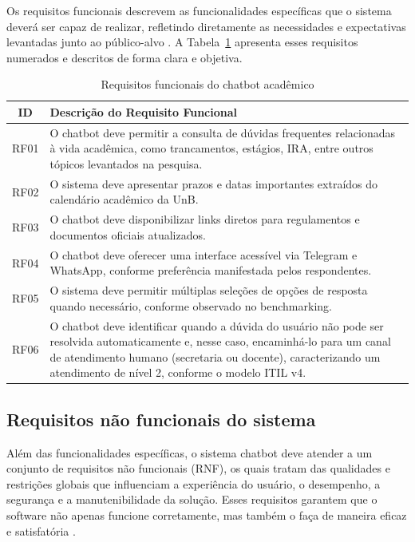 Os requisitos funcionais descrevem as funcionalidades específicas que o sistema deverá ser capaz de realizar, refletindo diretamente as necessidades e expectativas levantadas junto ao público-alvo \cite{pressman2016engenharia}. A Tabela~\ref{tab:requisitos_funcionais} apresenta esses requisitos numerados e descritos de forma clara e objetiva.

\begin{table}[H]
\caption{Requisitos funcionais do chatbot acadêmico}
\label{tab:requisitos_funcionais}
\centering
\begin{tabular}{|c|p{12cm}|}
\hline
\textbf{ID} & \textbf{Descrição do Requisito Funcional} \\
\hline
RF01 & O chatbot deve permitir a consulta de dúvidas frequentes relacionadas à vida acadêmica, como trancamentos, estágios, IRA, entre outros tópicos levantados na pesquisa. \\
\hline
RF02 & O sistema deve apresentar prazos e datas importantes extraídos do calendário acadêmico da UnB. \\
\hline
RF03 & O chatbot deve disponibilizar links diretos para regulamentos e documentos oficiais atualizados. \\
\hline
RF04 & O chatbot deve oferecer uma interface acessível via Telegram e WhatsApp, conforme preferência manifestada pelos respondentes. \\
\hline
RF05 & O sistema deve permitir múltiplas seleções de opções de resposta quando necessário, conforme observado no benchmarking. \\
\hline
RF06 & O chatbot deve identificar quando a dúvida do usuário não pode ser resolvida automaticamente e, nesse caso, encaminhá-lo para um canal de atendimento humano (secretaria ou docente), caracterizando um atendimento de nível 2, conforme o modelo ITIL v4. \\
\hline
\end{tabular}
\end{table}

\subsection{Requisitos não funcionais do sistema}

Além das funcionalidades específicas, o sistema chatbot deve atender a um conjunto de requisitos não funcionais (RNF), os quais tratam das qualidades e restrições globais que influenciam a experiência do usuário, o desempenho, a segurança e a manutenibilidade da solução. Esses requisitos garantem que o software não apenas funcione corretamente, mas também o faça de maneira eficaz e satisfatória \cite{pressman2016engenharia}.

